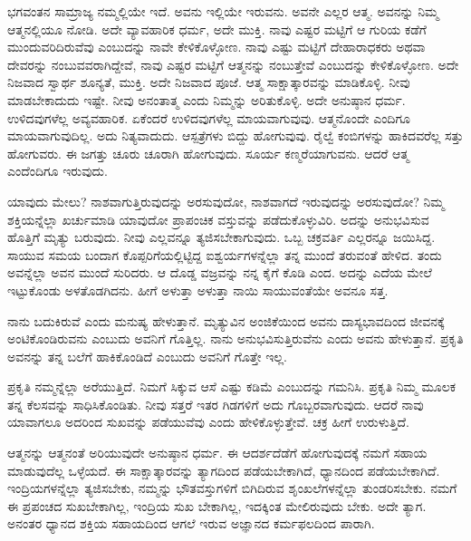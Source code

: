 \vskip 3pt

ಭಗವಂತನ ಸಾಮ್ರಾಜ್ಯ ನಮ್ಮಲ್ಲಿಯೇ ಇದೆ. ಅವನು ಇಲ್ಲಿಯೇ ಇರುವನು. ಅವನೇ ಎಲ್ಲರ ಆತ್ಮ. ಅವನನ್ನು ನಿಮ್ಮ ಆತ್ಮನಲ್ಲಿಯೂ ನೋಡಿ. ಅದೇ ವ್ಯಾವಹಾರಿಕ ಧರ್ಮ, ಅದೇ ಮುಕ್ತಿ. ನಾವು ಎಷ್ಟರ ಮಟ್ಟಿಗೆ ಆ ಗುರಿಯ ಕಡೆಗೆ ಮುಂದುವರಿದಿರುವೆವು ಎಂಬುದನ್ನು ನಾವೇ ಕೇಳಿಕೊಳ್ಳೋಣ. ನಾವು ಎಷ್ಟು ಮಟ್ಟಿಗೆ ದೇಹಾರಾಧಕರು ಅಥವಾ ದೇವರನ್ನು ನಂಬುವವರಾಗಿದ್ದೇವೆ, ನಾವು ಎಷ್ಟರ ಮಟ್ಟಿಗೆ ಆತ್ಮನನ್ನು ನಂಬುತ್ತೇವೆ ಎಂಬುದನ್ನು ಕೇಳಿಕೊಳ್ಳೋಣ. ಅದೇ ನಿಜವಾದ ಸ್ವಾರ್ಥ ಶೂನ್ಯತೆ, ಮುಕ್ತಿ. ಅದೇ ನಿಜವಾದ ಪೂಜೆ. ಆತ್ಮ ಸಾಕ್ಷಾತ್ಕಾರವನ್ನು ಮಾಡಿಕೊಳ್ಳಿ. ನೀವು ಮಾಡಬೇಕಾದುದು ಇಷ್ಟೇ. ನೀವು ಅನಂತಾತ್ಮ ಎಂದು ನಿಮ್ಮನ್ನು ಅರಿತುಕೊಳ್ಳಿ. ಅದೇ ಅನುಷ್ಠಾನ ಧರ್ಮ. ಉಳಿದವುಗಳೆಲ್ಲ ಅವ್ಯವಹಾರಿಕ. ಏಕೆಂದರೆ ಉಳಿದವುಗಳೆಲ್ಲ ಮಾಯವಾಗುವುವು. ಆತ್ಮನೊಂದೇ ಎಂದಿಗೂ ಮಾಯವಾಗುವುದಿಲ್ಲ. ಅದು ನಿತ್ಯವಾದುದು. ಆಸ್ಪತ್ರೆಗಳು ಬಿದ್ದು ಹೋಗುವುವು. ರೈಲ್ವೆ ಕಂಬಿಗಳನ್ನು ಹಾಕಿದವರೆಲ್ಲ ಸತ್ತು ಹೋಗುವರು. ಈ ಜಗತ್ತು ಚೂರು ಚೂರಾಗಿ ಹೋಗುವುದು. ಸೂರ್ಯ ಕಣ್ಮರೆಯಾಗುವನು. ಆದರೆ ಆತ್ಮ ಎಂದೆಂದಿಗೂ ಇರುವುದು.

\vskip 3pt

ಯಾವುದು ಮೇಲು? ನಾಶವಾಗುತ್ತಿರುವುದನ್ನು ಅರಸುವುದೋ, ನಾಶವಾಗದೆ ಇರುವುದನ್ನು ಅರಸುವುದೋ? ನಿಮ್ಮ ಶಕ್ತಿಯನ್ನೆಲ್ಲಾ ಖರ್ಚುಮಾಡಿ ಯಾವುದೋ ಪ್ರಾಪಂಚಿಕ ವಸ್ತುವನ್ನು ಪಡೆದುಕೊಳ್ಳುವಿರಿ. ಅದನ್ನು ಅನುಭವಿಸುವ ಹೊತ್ತಿಗೆ ಮೃತ್ಯು ಬರುವುದು. ನೀವು ಎಲ್ಲವನ್ನೂ ತ್ಯಜಿಸಬೇಕಾಗುವುದು. ಒಬ್ಬ ಚಕ್ರವರ್ತಿ ಎಲ್ಲರನ್ನೂ ಜಯಿಸಿದ್ದ. ಸಾಯುವ ಸಮಯ ಬಂದಾಗ ಕೊಪ್ಪರಿಗೆಯಲ್ಲಿಟ್ಟಿದ್ದ ಐಶ್ವರ್ಯಗಳನ್ನೆಲ್ಲಾ ತನ್ನ ಮುಂದೆ ತರುವಂತೆ ಹೇಳಿದ. ತಂದು ಅವನ್ನೆಲ್ಲಾ ಅವನ ಮುಂದೆ ಸುರಿದರು. ಆ ದೊಡ್ಡ ವಜ್ರವನ್ನು ನನ್ನ ಕೈಗೆ ಕೊಡಿ ಎಂದ. ಅದನ್ನು ಎದೆಯ ಮೇಲೆ ಇಟ್ಟುಕೊಂಡು ಅಳತೊಡಗಿದನು. ಹೀಗೆ ಅಳುತ್ತಾ ಅಳುತ್ತಾ ನಾಯಿ ಸಾಯುವಂತೆಯೇ ಅವನೂ ಸತ್ತ.

\vskip 3pt

ನಾನು ಬದುಕಿರುವೆ ಎಂದು ಮನುಷ್ಯ ಹೇಳುತ್ತಾನೆ. ಮೃತ್ಯುವಿನ ಅಂಜಿಕೆಯಿಂದ ಅವನು ದಾಸ್ಯಭಾವದಿಂದ ಜೀವನಕ್ಕೆ ಅಂಟಿಕೊಂಡಿರುವನು ಎಂಬುದು ಅವನಿಗೆ ಗೊತ್ತಿಲ್ಲ. ನಾನು ಅನುಭವಿಸುತ್ತಿರುವೆನು ಎಂದು ಅವನು ಹೇಳುತ್ತಾನೆ. ಪ್ರಕೃತಿ ಅವನನ್ನು ತನ್ನ ಬಲೆಗೆ ಹಾಕಿಕೊಂಡಿದೆ ಎಂಬುದು ಅವನಿಗೆ ಗೊತ್ತೇ ಇಲ್ಲ.

ಪ್ರಕೃತಿ ನಮ್ಮನ್ನೆಲ್ಲಾ ಅರೆಯುತ್ತಿದೆ. ನಿಮಗೆ ಸಿಕ್ಕುವ ಆಸೆ ಎಷ್ಟು ಕಡಿಮೆ ಎಂಬುದನ್ನು ಗಮನಿಸಿ. ಪ್ರಕೃತಿ ನಿಮ್ಮ ಮೂಲಕ ತನ್ನ ಕೆಲಸವನ್ನು ಸಾಧಿಸಿಕೊಂಡಿತು. ನೀವು ಸತ್ತರೆ ಇತರ ಗಿಡಗಳಿಗೆ ಅದು ಗೊಬ್ಬರವಾಗುವುದು. ಆದರೆ ನಾವು ಯಾವಾಗಲೂ ಅದರಿಂದ ಸುಖವನ್ನು ಪಡೆಯುವೆವು ಎಂದು ಹೇಳಿಕೊಳ್ಳುತ್ತೇವೆ. ಚಕ್ರ ಹೀಗೆ ಉರುಳುತ್ತಿದೆ.

ಆತ್ಮನನ್ನು ಆತ್ಮನಂತೆ ಅರಿಯುವುದೇ ಅನುಷ್ಠಾನ ಧರ್ಮ. ಈ ಆದರ್ಶದೆಡೆಗೆ ಹೋಗುವುದಕ್ಕೆ ನಮಗೆ ಸಹಾಯ ಮಾಡುವುದೆಲ್ಲ ಒಳ್ಳೆಯದೆ. ಈ ಸಾಕ್ಷಾತ್ಕಾರವನ್ನು ತ್ಯಾಗದಿಂದ ಪಡೆಯಬೇಕಾಗಿದೆ, ಧ್ಯಾನದಿಂದ ಪಡೆಯಬೇಕಾಗಿದೆ. ಇಂದ್ರಿಯಗಳನ್ನೆಲ್ಲಾ ತ್ಯಜಿಸಬೇಕು, ನಮ್ಮನ್ನು ಭೌತವಸ್ತುಗಳಿಗೆ ಬಿಗಿದಿರುವ ಶೃಂಖಲೆಗಳನ್ನೆಲ್ಲಾ ತುಂಡರಿಸಬೇಕು. ನಮಗೆ ಈ ಪ್ರಪಂಚದ ಸುಖಬೇಕಾಗಿಲ್ಲ, ಇಂದ್ರಿಯ ಸುಖ ಬೇಕಾಗಿಲ್ಲ, ಇದಕ್ಕಿಂತ ಮೇಲಿರುವುದು ಬೇಕು. ಅದೇ ತ್ಯಾಗ. ಅನಂತರ ಧ್ಯಾನದ ಶಕ್ತಿಯ ಸಹಾಯದಿಂದ ಆಗಲೆ ಇರುವ ಅಜ್ಞಾನದ ಕರ್ಮಫಲದಿಂದ ಪಾರಾಗಿ.

